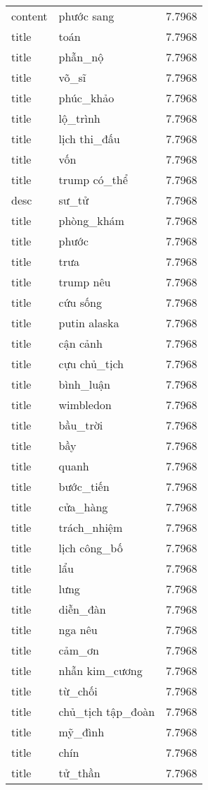 \documentclass{article}
\begin{document}
\begin{tabular}{lll}
content & phước sang & 7.7968\\
title & toán & 7.7968\\
title & phẫn\_nộ & 7.7968\\
title & võ\_sĩ & 7.7968\\
title & phúc\_khảo & 7.7968\\
title & lộ\_trình & 7.7968\\
title & lịch thi\_đấu & 7.7968\\
title & vốn & 7.7968\\
title & trump có\_thể & 7.7968\\
desc & sư\_tử & 7.7968\\
title & phòng\_khám & 7.7968\\
title & phước & 7.7968\\
title & trưa & 7.7968\\
title & trump nêu & 7.7968\\
title & cứu sống & 7.7968\\
title & putin alaska & 7.7968\\
title & cận cảnh & 7.7968\\
title & cựu chủ\_tịch & 7.7968\\
title & bình\_luận & 7.7968\\
title & wimbledon & 7.7968\\
title & bầu\_trời & 7.7968\\
title & bầy & 7.7968\\
title & quanh & 7.7968\\
title & bước\_tiến & 7.7968\\
title & cửa\_hàng & 7.7968\\
title & trách\_nhiệm & 7.7968\\
title & lịch công\_bố & 7.7968\\
title & lẩu & 7.7968\\
title & lưng & 7.7968\\
title & diễn\_đàn & 7.7968\\
title & nga nêu & 7.7968\\
title & cảm\_ơn & 7.7968\\
title & nhẫn kim\_cương & 7.7968\\
title & từ\_chối & 7.7968\\
title & chủ\_tịch tập\_đoàn & 7.7968\\
title & mỹ\_đình & 7.7968\\
title & chín & 7.7968\\
title & tử\_thần & 7.7968\\

\end{tabular}
\end{document}

